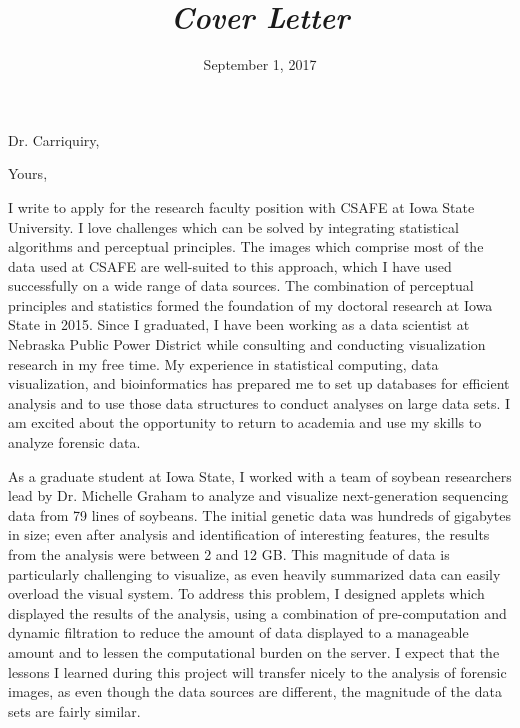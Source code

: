 \documentclass[12pt, letterpaper, sans]{moderncv}
\title{\emph{Cover Letter}}
\begin{document}
\date{September 1, 2017}
\opening{Dr. Carriquiry,}
\closing{Yours,}
\makelettertitle

I write to apply for the research faculty position with CSAFE at Iowa State University. I love challenges which can be solved by integrating statistical algorithms and perceptual principles. The images which comprise most of the data used at CSAFE are well-suited to this approach, which I have used successfully on a wide range of data sources. The combination of perceptual principles and statistics formed the foundation of my doctoral research at Iowa State in 2015. Since I graduated, I have been working as a data scientist at Nebraska Public Power District while consulting and conducting visualization research in my free time. My experience in statistical computing, data visualization, and bioinformatics has prepared me to set up databases for efficient analysis and to use those data structures to conduct analyses on large data sets. I am excited about the opportunity to return to academia and use my skills to analyze forensic data. 

As a graduate student at Iowa State, I worked with a team of soybean researchers lead by Dr. Michelle Graham to analyze and visualize next-generation sequencing data from 79 lines of soybeans. The initial genetic data was hundreds of gigabytes in size; even after analysis and identification of interesting features, the results from the analysis were between 2 and 12 GB. This magnitude of data is particularly challenging to visualize, as even heavily summarized data can easily overload the visual system. To address this problem, I designed applets which displayed the results of the analysis, using a combination of pre-computation and dynamic filtration to reduce the amount of data displayed to a manageable amount and to lessen the computational burden on the server. I expect that the lessons I learned during this project will transfer nicely to the analysis of forensic images, as even though the data sources are different, the magnitude of the data sets are fairly similar. 
\end{document}

